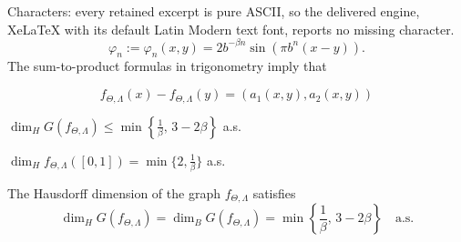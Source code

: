 \documentclass[10pt,a4paper]{amsart}
\begin{document}
Characters: every retained excerpt is pure ASCII, so the delivered engine, XeLaTeX with its default Latin Modern text font, reports no missing character.
\begin{equation}\label{eq-phi-n}
	\varphi_n:=\varphi_n(x,y)=2b^{-\beta n}\sin(\pi b^n(x-y)). 
\end{equation} The sum-to-product formulas in trigonometry imply that

\begin{equation}\label{eq- vector-valued funct.}
	f_{\Theta,\Lambda}(x) -f_{\Theta,\Lambda}(y)=(a_1(x,y), a_2(x,y))
\end{equation}

	\begin{lemma}\label{lem-lowerbound}
		$\dim_H G(f_{\Theta,\Lambda})\le \min\left\{\frac{1}{\beta}, \, 3-2\beta\right\}$ a.s.
	\end{lemma}

\begin{theorem}\label{thm2.1}
 	$\dim_H f_{\Theta,\Lambda}([0,1]) = \min\{2, \frac{1}{\beta}\}$ a.s.
 \end{theorem}

 \begin{theorem} 
 	The Hausdorff dimension of the graph $f_{\Theta,\Lambda}$ satisfies
 	$$\dim_H G(f_{\Theta,\Lambda}) =\dim_B G(f_{\Theta,\Lambda}) = \min\left\{\frac{1}{\beta}, \, 3 -2\beta\right\} \quad \text{a.s.}$$
 \end{theorem}
\end{document}
